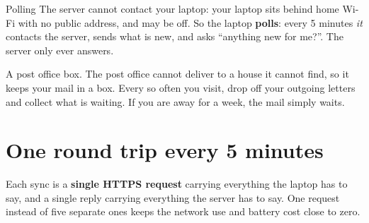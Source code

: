 \documentclass[11pt,a4paper]{article}
\begin{document}
\begin{concept}{Polling}
The server cannot contact your laptop: your laptop sits behind home Wi-Fi with no public
address, and may be off. So the laptop \textbf{polls}: every 5 minutes \emph{it} contacts the
server, sends what is new, and asks ``anything new for me?''. The server only ever answers.
\end{concept}

\begin{analogy}
A post office box. The post office cannot deliver to a house it cannot find, so it keeps your
mail in a box. Every so often you visit, drop off your outgoing letters and collect what is
waiting. If you are away for a week, the mail simply waits.
\end{analogy}

\begin{center}
\end{center}

\section{One round trip every 5 minutes}

Each sync is a \textbf{single HTTPS request} carrying everything the laptop has to say, and a
single reply carrying everything the server has to say. One request instead of five separate
ones keeps the network use and battery cost close to zero.
\end{document}
